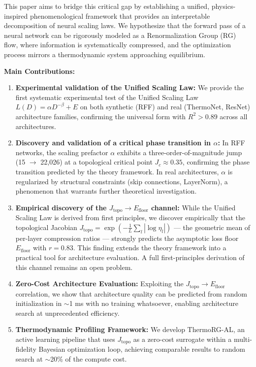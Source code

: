 \documentclass[11pt, a4paper]{article}
\theoremstyle{definition}
\begin{document}
This paper aims to bridge this critical gap by establishing a unified, physics-inspired phenomenological framework that provides an interpretable decomposition of neural scaling laws. We hypothesize that the forward pass of a neural network can be rigorously modeled as a Renormalization Group (RG) flow, where information is systematically compressed, and the optimization process mirrors a thermodynamic system approaching equilibrium.

\textbf{Main Contributions:}
\begin{enumerate}
    \item \textbf{Experimental validation of the Unified Scaling Law:} We provide the first systematic experimental test of the Unified Scaling Law $L(D) = \alpha D^{-\beta} + E$ on both synthetic (RFF) and real (ThermoNet, ResNet) architecture families, confirming the universal form with $R^2 > 0.89$ across all architectures.
    
    \item \textbf{Discovery and validation of a critical phase transition in $\alpha$:} In RFF networks, the scaling prefactor $\alpha$ exhibits a three-order-of-magnitude jump (15 $\to$ 22,026) at a topological critical point $J_c \approx 0.35$, confirming the phase transition predicted by the theory framework. In real architectures, $\alpha$ is regularized by structural constraints (skip connections, LayerNorm), a phenomenon that warrants further theoretical investigation.
    
    \item \textbf{Empirical discovery of the $J_\mathrm{topo} \to E_\mathrm{floor}$ channel:} While the Unified Scaling Law is derived from first principles, we discover empirically that the topological Jacobian $J_\mathrm{topo} = \exp(-\frac{1}{L}\sum_l|\log\eta_l|)$ — the geometric mean of per-layer compression ratios — strongly predicts the asymptotic loss floor $E_\mathrm{floor}$ with $r = 0.83$. This finding extends the theory framework into a practical tool for architecture evaluation. A full first-principles derivation of this channel remains an open problem.
    
    \item \textbf{Zero-Cost Architecture Evaluation:} Exploiting the $J_\mathrm{topo} \to E_\mathrm{floor}$ correlation, we show that architecture quality can be predicted from random initialization in $\sim$1 ms with no training whatsoever, enabling architecture search at unprecedented efficiency.
    
    \item \textbf{Thermodynamic Profiling Framework:} We develop ThermoRG-AL, an active learning pipeline that uses $J_\mathrm{topo}$ as a zero-cost surrogate within a multi-fidelity Bayesian optimization loop, achieving comparable results to random search at $\sim$20\% of the compute cost.
\end{enumerate}
\end{document}
